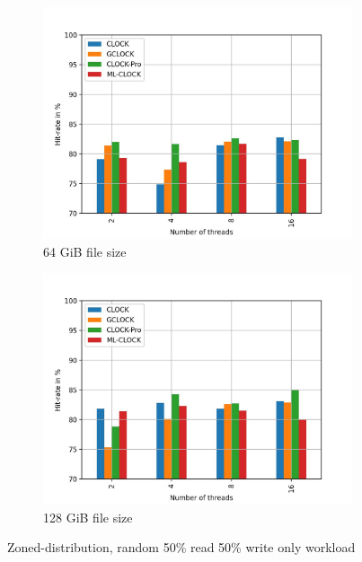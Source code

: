\documentclass[
	12pt,
	a4paper,
	abstract,
	bibliography=totoc,
	chapterprefix,
	headings=openright,
	numbers=endperiod,
	parskip=half,
	twoside,
]{scrreprt}
\begin{document}
\begin{figure}[H]
\begin{subfigure}{0.4\textwidth}
		\includegraphics[width=\textwidth]{multi_64_gb_rw_50to50_zoned.jpg}		
		\caption{64 GiB file size}
		\label{fig:rw_50to50 64 zoned}
	\end{subfigure}
	\hfill
	\begin{subfigure}{0.4\textwidth}
		\includegraphics[width=\textwidth]{multi_128_gb_rw_50to50_zoned.jpg}		
		\caption{128 GiB file size}
		\label{fig:rw_50to50 128 zoned}
	\end{subfigure}
	\caption{Zoned-distribution, random 50\% read 50\% write only workload}
	\label{fig:multi zoned rw_50to50}
\end{figure}
\end{document}
